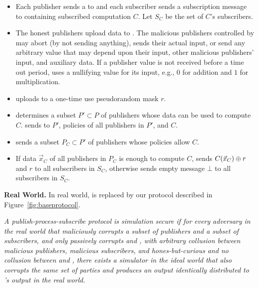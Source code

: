 \begin{itemize}[leftmargin=*,itemsep=4pt,topsep=4pt]
		\item Each publisher sends a \policy to \F and each subscriber sends a
			subscription message to \F containing subscribed computation $C$. Let $S_C$
			be the set of $C$'s subscribers. 
			
		
		\item The honest publishers upload data to \F. The malicious publishers
			controlled by \Adv may abort (by not sending anything), sends their
			actual input, or send any arbitrary value that may depend upon their
			input, other malicious publishers' input, and auxiliary data. If a
			publisher value is not received before a time out period, \F uses a
			nullifying value for its input, e.g., $0$ for addition and $1$ for
			multiplication. 
		
		\item \garbler uploads to \F a one-time use pseudorandom mask $r$.

		\item \F determines a subset $P' \subset P$ of publishers whose data can be
			used to compute $C$. \F sends to \broker $P'$, policies of all publishers
			in $P'$, and $C$.

		\item \broker sends \F a subset $P_C \subset P'$ of publishers whose
			policies allow $C$.
			
		\item If data $\vec{x}_C$ of all publishers in $P_C$ is enough to compute
			$C$, \F sends $C(\vec{x}_C) \oplus r$ and $r$ to all subscribers in $S_C$,
			otherwise \F sends empty message $\bot$ to all subscribers in $S_C$.

\end{itemize}
\vspace{6pt}
\noindent\textbf{Real World.} In real world, \F is replaced by our
protocol described in Figure~\ref{fig:baseprotocol}.\\

\begin{mdframed}[style=mydefframe]

\begin{define}
	\label{def:security}

	\textit{	A publish-process-subscribe protocol is simulation secure if for
	every adversary \Adv in the real world that maliciously corrupts a subset of
	publishers and a subset of subscribers, and only passively corrupts \broker
	and \garbler, with arbitrary collusion between malicious publishers,
	malicious subscribers, and hones-but-curious \broker and \emph{no} collusion
	between \broker and \garbler, there exists a simulator \Sim in the ideal
	world that also corrupts the same set of parties and produces an output
	identically distributed to \Adv's output in the real world.  
	}

\end{define}

\end{mdframed}
